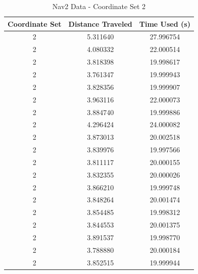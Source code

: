\documentclass[]{article}
\begin{document}
	
	\begin{table}[h!]
		\centering
		\begin{tabular}{|c|c|c|}
			\hline
			Coordinate Set & Distance Traveled & Time Used (s) \\
			\hline
			2 & 5.311640 & 27.996754 \\
			2 & 4.080332 & 22.000514 \\
			2 & 3.818398 & 19.998617 \\
			2 & 3.761347 & 19.999943 \\
			2 & 3.828356 & 19.999907 \\
			2 & 3.963116 & 22.000073 \\
			2 & 3.884740 & 19.999886 \\
			2 & 4.296424 & 24.000082 \\
			2 & 3.873013 & 20.002518 \\
			2 & 3.839976 & 19.997566 \\
			2 & 3.811117 & 20.000155 \\
			2 & 3.832355 & 20.000026 \\
			2 & 3.866210 & 19.999748 \\
			2 & 3.848264 & 20.001474 \\
			2 & 3.854485 & 19.998312 \\
			2 & 3.844553 & 20.001375 \\
			2 & 3.891537 & 19.998770 \\
			2 & 3.788880 & 20.000184 \\
			2 & 3.852515 & 19.999944 \\
			\hline
		\end{tabular}
		\caption{Nav2 Data - Coordinate Set 2}
		\label{tab:3}
	\end{table}
	
\end{document}
